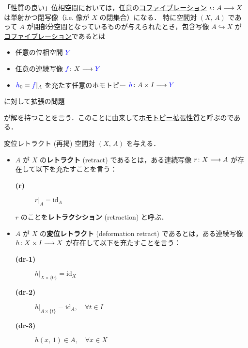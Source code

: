 \documentclass[algtopo_main]{subfiles}
\begin{document}
「性質の良い」位相空間においては，任意の\hyperref[def:cofibration]{コファイブレーション} $\iota \colon A \longrightarrow X$ は単射かつ閉写像（i.e. 像が $X$ の閉集合）になる．
特に空間対 $(X,\, A)$ であって $A$ が閉部分空間となっているものが与えられたとき，包含写像 $A \hookrightarrow X$ が\hyperref[def:cofibration]{コファイブレーション}であるとは
\begin{itemize}
    \item 任意の位相空間 $\textcolor{blue}{Y}$
    \item 任意の連続写像 $\textcolor{blue}{f} \colon X \longrightarrow \textcolor{blue}{Y}$
    \item  $\textcolor{blue}{h}_0 = \textcolor{blue}{f}|_A$ を充たす任意のホモトピー $\textcolor{blue}{h} \colon A \times I \longrightarrow \textcolor{blue}{Y}$ 
\end{itemize}
に対して拡張の問題
\begin{center}
\end{center}
が解を持つことを言う．このことに由来して\hyperref[def:HEP]{ホモトピー拡張性質}と呼ぶのである．

\begin{mydef}[label=def:retract, breakable]{変位レトラクト (再掲)}
    空間対 $(X,\, A)$ を与える．
    \begin{itemize}
        \item $A$ が $X$ の\textbf{レトラクト} (retract) であるとは，ある連続写像 $r \colon X \longrightarrow A$ が存在して以下を充たすことを言う：
        \begin{description}
            \item[\textbf{(r)}] $r|_A = \mathrm{id}_A$
        \end{description}
        $r$ のことを\textbf{レトラクシション} (retraction) と呼ぶ．
        \item $A$ が $X$ の\textbf{変位レトラクト} (deformation retract) であるとは，ある連続写像 $h \colon X \times I \longrightarrow X$ が存在して以下を充たすことを言う：
        \begin{description}
            \item[\textbf{(dr-1)}] $h|_{X \times \{0\}} = \mathrm{id}_X$
            \item[\textbf{(dr-2)}] $h|_{A \times \{t\}} = \mathrm{id}_A,\quad \forall t \in I$
            \item[\textbf{(dr-3)}] $h(x,\, 1) \in A,\quad \forall x \in X$
        \end{description}
    \end{itemize}
\end{mydef}
\end{document}
